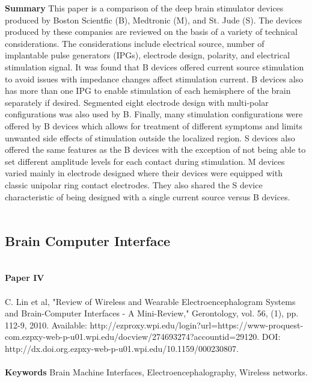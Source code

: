 \noindent
\textbf{Summary} This paper is a comparison of the deep brain stimulator devices produced by Boston Scientfic (B), Medtronic (M), and St. Jude (S). The devices produced by these companies are reviewed on the basis of a variety of technical considerations. The considerations include electrical source, number of implantable pulse generators (IPGs), electrode design, polarity, and electrical stimulation signal. It was found that B devices offered current source stimulation to avoid issues with impedance changes affect stimulation current. B devices also has more than one IPG to enable stimulation of each hemisphere of the brain separately if desired. Segmented eight electrode design with multi-polar configurations was also used by B. Finally, many stimulation configurations were offered by B devices which allows for treatment of different symptoms and limits unwanted side effects of stimulation outside the localized region. S devices also offered the same features as the B devices with the exception of not being able to set different amplitude levels for each contact during stimulation. M devices varied mainly in electrode designed where their devices were equipped with classic unipolar ring contact electrodes. They also shared the S device characteristic of being designed with a single current source versus B devices. \\ \\


\subsection{Brain Computer Interface}
\noindent
\\ 
\textbf{Paper IV} 
\\ \\
\noindent
C. Lin et al, "Review of Wireless and Wearable Electroencephalogram Systems and Brain-Computer Interfaces - A Mini-Review," Gerontology, vol. 56, (1), pp. 112-9, 2010. Available: http://ezproxy.wpi.edu/login?url=https://www-proquest-com.ezpxy-web-p-u01.wpi.edu/docview/274693274?accountid=29120. DOI: http://dx.doi.org.ezpxy-web-p-u01.wpi.edu/10.1159/000230807. \\ \\

\noindent
\textbf{Keywords} Brain Machine Interfaces, Electroencephalography, Wireless networks.  \\ \\

